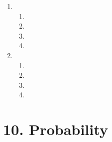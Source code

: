 \begin{enumerate}[itemsep=6pt, label=\textbf{\arabic*}.]
  \item %

    \begin{enumerate}[noitemsep, label=\textbf{(\alph*)} ]
    \item %
    \item %
    \item %
\item %
    \end{enumerate}

  \item %

    \begin{enumerate}[noitemsep, label=\textbf{(\alph*)} ]
    \item %
    \item %
    \item %
    \item %
    \end{enumerate}

  \end{enumerate}


\section {10. Probability}

